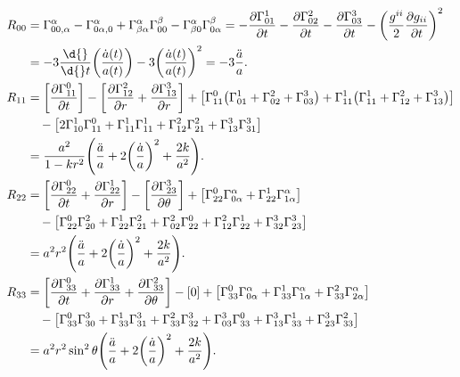 \documentclass[../天体物理基础.tex]{subfiles}
\begin{document}
\begin{align}
R_{00}&=\Gamma_{00,\alpha}^{\alpha}-\Gamma_{0\alpha, 0}^{\alpha}+\Gamma_{\beta\alpha}^{\alpha}\Gamma_{00}^{\beta}-\Gamma_{\beta0}^{\alpha}\Gamma_{0\alpha}^{\beta}=-\frac{\partial\Gamma_{01}^{1}}{\partial{}t}-\frac{\partial\Gamma_{02}^{2}}{\partial{}t}-\frac{\partial\Gamma_{03}^{3}}{\partial{}t}-\mleft(\frac{g^{ii}}{2}\frac{\partial{}g_{ii}}{\partial{}t}\mright)^{2}\notag\\
&=-3\frac{\d{}}{\d{}t}\mleft(\frac{\dot{a}\mleft(t\mright)}{a\mleft(t\mright)}\mright)-3\mleft(\frac{\dot{a}\mleft(t\mright)}{a\mleft(t\mright)}\mright)^{2}=-3\frac{\ddot{a}}{a}.\notag\\
R_{11}&=\mleft[\frac{\partial\Gamma_{11}^{0}}{\partial{}t}\mright]-\mleft[\frac{\partial\Gamma_{12}^{2}}{\partial{}r}+\frac{\partial\Gamma_{13}^{3}}{\partial{}r}\mright]+\mleft[\Gamma_{11}^{0}\mleft(\Gamma_{01}^{1}+\Gamma_{02}^{2}+\Gamma_{03}^{3}\mright)+\Gamma_{11}^{1}\mleft(\Gamma_{11}^{1}+\Gamma_{12}^{2}+\Gamma_{13}^{3}\mright)\mright]\notag\\
&\quad-\mleft[2\Gamma_{10}^{1}\Gamma_{11}^{0}+\Gamma_{11}^{1}\Gamma_{11}^{1}+\Gamma_{12}^{2}\Gamma_{21}^{2}+\Gamma_{13}^{3}\Gamma_{31}^{3}\mright]\notag\\
&=\frac{a^{2}}{1-kr^{2}}\mleft(\frac{\ddot a}{a}+2\mleft(\frac{\dot{a}}{a}\mright)^{2}+\frac{2k}{a^{2}}\mright).\notag\\
R_{22}&=\mleft[\frac{\partial\Gamma_{22}^{0}}{\partial{}t}+\frac{\partial\Gamma_{22}^{1}}{\partial{}r}\mright]-\mleft[\frac{\partial\Gamma_{23}^{3}}{\partial\theta}\mright]+\mleft[\Gamma_{22}^{0}\Gamma_{0\alpha}^{\alpha}+\Gamma_{22}^{1}\Gamma_{1\alpha}^{\alpha}\mright]\notag\\
&\quad-\mleft[\Gamma_{22}^{0}\Gamma_{20}^{2}+\Gamma_{22}^{1}\Gamma_{21}^{2}+\Gamma_{02}^{2}\Gamma_{22}^{0}+\Gamma_{12}^{2}\Gamma_{22}^{1}+\Gamma_{32}^{3}\Gamma_{23}^{3}\mright]\notag\\
&=a^{2}r^{2}\mleft(\frac{\ddot{a}}{a}+2\mleft(\frac{\dot{a}}{a}\mright)^{2}+\frac{2k}{a^{2}}\mright).\notag\\
R_{33}&=\mleft[\frac{\partial\Gamma_{33}^{0}}{\partial{}t}+\frac{\partial\Gamma_{33}^{1}}{\partial{}r}+\frac{\partial\Gamma_{33}^{2}}{\partial\theta}\mright]-\mleft[0\mright]+\mleft[\Gamma_{33}^{0}\Gamma_{0\alpha}^{\alpha}+\Gamma_{33}^{1}\Gamma_{1\alpha}^{\alpha}+\Gamma_{33}^{2}\Gamma_{2\alpha}^{\alpha}\mright]\notag\\
&\quad-\mleft[\Gamma_{33}^{0}\Gamma_{30}^{3}+\Gamma_{33}^{1}\Gamma_{31}^{3}+\Gamma_{33}^{2}\Gamma_{32}^{3}+\Gamma_{03}^{3}\Gamma_{33}^{0}+\Gamma_{13}^{3}\Gamma_{33}^{1}+\Gamma_{23}^{3}\Gamma_{33}^{2}\mright]\notag\\
&=a^{2}r^{2}\sin^{2}{\theta}\mleft(\frac{\ddot a}{a}+2\mleft(\frac{\dot a}{a}\mright)^{2}+\frac{2k}{a^{2}}\mright).\notag
\end{align}
\end{document}
